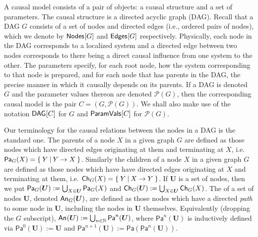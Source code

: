 \color{red}



A causal model consists of a pair of objects: a causal structure and a set of parameters.  The causal structure is a directed acyclic graph (DAG).  Recall that a DAG $G$ consists of a set of nodes and directed edges (i.e., ordered pairs of nodes), which we denote by $\SmallNamedFunction{Nodes}{G}$ and $\SmallNamedFunction{Edges}{G}$ respectively.  Physically, each node in the DAG corresponds to a localized system and a directed edge between two nodes corresponds to there being a direct causal influence from one system to the other.  The parameters specify, for each root node, how the system corresponding to that node is prepared, and for each node that has parents in the DAG, the precise manner in which it causally depends on its parents.  If a DAG is denoted $G$ and the parameter values thereon are denoted $\mathcal{P}(G)$, then the corresponding causal model is the pair $C = (G,\mathcal{P}(G))$.  We shall also make use of the notation $\SmallNamedFunction{DAG}{C}$ for $G$ and $\SmallNamedFunction{ParamVals}{C}$ for $\mathcal{P}(G)$.

Our terminology for the causal relations between the nodes in a DAG is the standard one. The parents of a node $X$ in a given graph $G$ are defined as those nodes which have directed edges originating at them and terminating at $X$, i.e. $\Pa[G]{X} = \{\:Y\:|\:Y\to X\:\}$.  Similarly the children of a node $X$ in a given graph $G$ are defined as those nodes which have have directed edges originating at $X$ and terminating at them, i.e. $\Ch[G]{X} = \{\:Y\:|\: X\to Y\:\}$. If $\bm{U}$ is a set of nodes, then we put $\Pa[G]{\bm{U}} := \bigcup_{X\in\bm{U}} \Pa[G]{X}$ and $\Ch[G]{\bm{U}} := \bigcup_{X\in\bm{U}} \Ch[G]{X}$.  The  of a set of nodes $\bm{U}$, denoted $\An[G]{\bm{U}}$, are defined as those nodes which have a directed \emph{path} to some node in $\bm{U}$, including the nodes in $\bm{U}$ themselves. Equivalently (dropping the $G$ subscript), $\An{\bm{U}} := \bigcup_{n\in\mathbb{N}} \mathsf{Pa}^n(\bm{U})$, where $\mathsf{Pa}^n(\bm{U})$ is inductively defined via $\mathsf{Pa}^0(\bm{U}) := \bm{U}$ and $\mathsf{Pa}^{n+1}(\bm{U}) := \mathsf{Pa}(\mathsf{Pa}^n(\bm{U}))$. 

